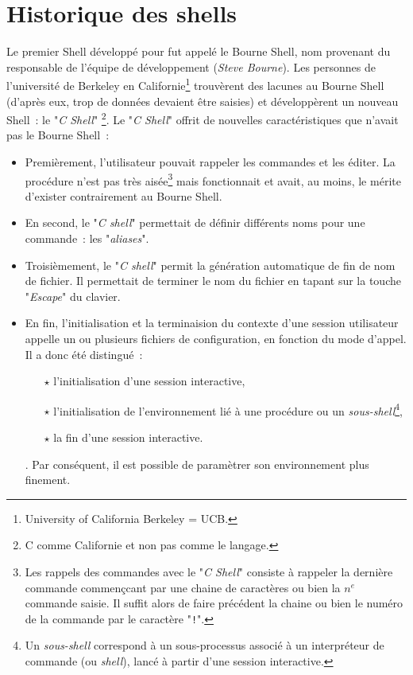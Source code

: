 \section{Historique des shells}

Le premier Shell d{\'e}velopp{\'e} pour {\Unix} fut appel{\'e} le
Bourne Shell, nom provenant du responsable
de l'{\'e}quipe de d{\'e}veloppement ({\sl Steve Bourne}). Les personnes
de l'universit{\'e} de Berkeley en Californie\footnote{University of
California Berkeley = UCB.} trouv{\`e}rent des lacunes au Bourne Shell
(d'apr{\`e}s eux, trop de donn{\'e}es devaient {\^e}tre saisies) et
d{\'e}velopp{\`e}rent un nouveau Shell~: le
"{\sl C Shell}" \footnote{C comme
Californie et non pas comme le langage.}. Le "{\sl C Shell}" offrit
de nouvelles caract{\'e}ristiques que n'avait pas le Bourne Shell~:
\begin{itemize}
	\item	Premi{\`e}rement, l'utilisateur pouvait rappeler les commandes et les {\'e}diter. La proc{\'e}dure
			n'est pas tr{\`e}s ais{\'e}e\footnote{Les rappels des commandes avec le "{\sl C Shell}" consiste
			{\`a} rappeler la derni{\`e}re commande commen\c{c}cant par une chaine de caract{\`e}res ou bien la $n^{e}$
			commande saisie. Il suffit alors de faire pr{\'e}c{\'e}dent la chaine ou bien le num{\'e}ro de la
			commande par le caract{\`e}re "{\tt !}".} mais fonctionnait et avait, au moins, le m{\'e}rite d'exister
			contrairement au Bourne Shell.
	\item	En second, le "{\sl C shell}" permettait de d{\'e}finir diff{\'e}rents noms pour une
			commande~: les "{\sl aliases}".
	\item	Troisi{\`e}mement, le "{\sl C shell}" permit la g{\'e}n{\'e}ration automatique 
			de fin de nom de fichier. Il permettait de terminer le nom du fichier en tapant
			sur la touche "{\sl Escape}" du clavier.
	\item	En fin, l'initialisation et la terminaision du contexte d'une session utilisateur
			appelle un ou plusieurs fichiers de configuration, en fonction du mode d'appel.
			Il a donc {\'e}t{\'e} distingu{\'e}~:
			\begin{itemize}
				\item[$\star$] l'initialisation d'une session interactive,
				\item[$\star$] l'initialisation de l'environnement li{\'e} {\`a} une proc{\'e}dure ou
								un {\it sous-shell}\footnote{Un {\it sous-shell} correspond
								{\`a} un sous-processus associ{\'e} {\`a} un interpr{\'e}teur de commande
								(ou {\it shell}), lanc{\'e} {\`a} partir d'une session interactive.},
				\item[$\star$] la fin d'une session interactive.
			\end{itemize}.
			Par cons{\'e}quent, il est possible de param{\`e}trer son environnement plus finement.
\end{itemize}

